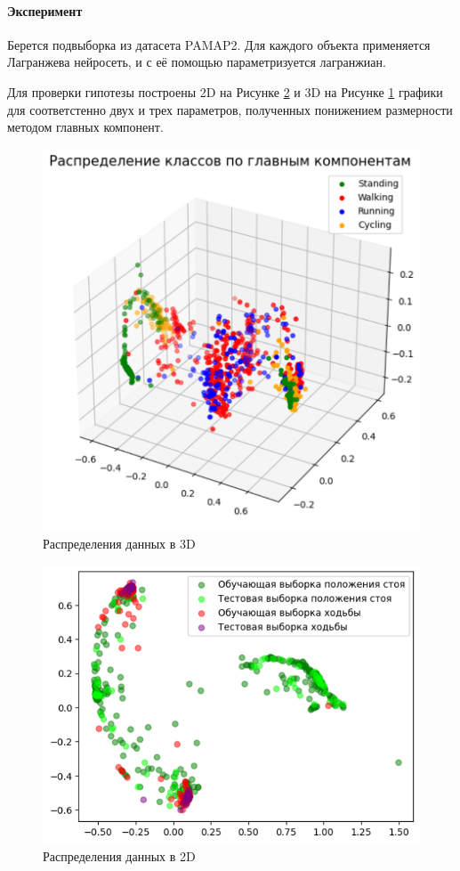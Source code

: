 \documentclass[12pt, twoside]{article}
\begin{document}
\paragraph{Эксперимент}
Берется подвыборка из датасета PAMAP2. Для каждого объекта применяется Лагранжева нейросеть, и с её помощью параметризуется лагранжиан.

Для проверки гипотезы построены 2D на Рисунке \ref{fig: 2D} и 3D на Рисунке \ref{fig: 3D}  графики для соответстенно двух и трех параметров, полученных понижением размерности методом главных компонент.


\begin{figure}[H]
    \centering
    \includegraphics[scale = 0.8]{Parametrized_3D_class.pdf}
    \caption{Распределения данных в 3D}
    \label{fig: 3D}
\end{figure}

\begin{figure}[H]
    \centering
    \includegraphics[scale = 0.8]{Parametrized_class_1.pdf}
    \caption{Распределения данных в 2D}
    \label{fig: 2D}
\end{figure}
\end{document}
